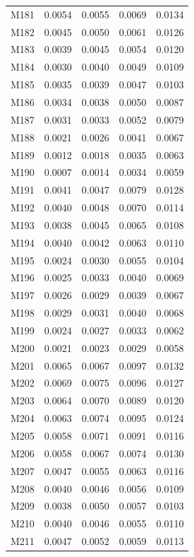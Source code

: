 \begin{longtable}{lrrrr}
M181 & 0.0054 & 0.0055 & 0.0069 & 0.0134 \\
M182 & 0.0045 & 0.0050 & 0.0061 & 0.0126 \\
M183 & 0.0039 & 0.0045 & 0.0054 & 0.0120 \\
M184 & 0.0030 & 0.0040 & 0.0049 & 0.0109 \\
M185 & 0.0035 & 0.0039 & 0.0047 & 0.0103 \\
M186 & 0.0034 & 0.0038 & 0.0050 & 0.0087 \\
M187 & 0.0031 & 0.0033 & 0.0052 & 0.0079 \\
M188 & 0.0021 & 0.0026 & 0.0041 & 0.0067 \\
M189 & 0.0012 & 0.0018 & 0.0035 & 0.0063 \\
M190 & 0.0007 & 0.0014 & 0.0034 & 0.0059 \\
M191 & 0.0041 & 0.0047 & 0.0079 & 0.0128 \\
M192 & 0.0040 & 0.0048 & 0.0070 & 0.0114 \\
M193 & 0.0038 & 0.0045 & 0.0065 & 0.0108 \\
M194 & 0.0040 & 0.0042 & 0.0063 & 0.0110 \\
M195 & 0.0024 & 0.0030 & 0.0055 & 0.0104 \\
M196 & 0.0025 & 0.0033 & 0.0040 & 0.0069 \\
M197 & 0.0026 & 0.0029 & 0.0039 & 0.0067 \\
M198 & 0.0029 & 0.0031 & 0.0040 & 0.0068 \\
M199 & 0.0024 & 0.0027 & 0.0033 & 0.0062 \\
M200 & 0.0021 & 0.0023 & 0.0029 & 0.0058 \\
M201 & 0.0065 & 0.0067 & 0.0097 & 0.0132 \\
M202 & 0.0069 & 0.0075 & 0.0096 & 0.0127 \\
M203 & 0.0064 & 0.0070 & 0.0089 & 0.0120 \\
M204 & 0.0063 & 0.0074 & 0.0095 & 0.0124 \\
M205 & 0.0058 & 0.0071 & 0.0091 & 0.0116 \\
M206 & 0.0058 & 0.0067 & 0.0074 & 0.0130 \\
M207 & 0.0047 & 0.0055 & 0.0063 & 0.0116 \\
M208 & 0.0040 & 0.0046 & 0.0056 & 0.0109 \\
M209 & 0.0038 & 0.0050 & 0.0057 & 0.0103 \\
M210 & 0.0040 & 0.0046 & 0.0055 & 0.0110 \\
M211 & 0.0047 & 0.0052 & 0.0059 & 0.0113 \\

\end{longtable}
